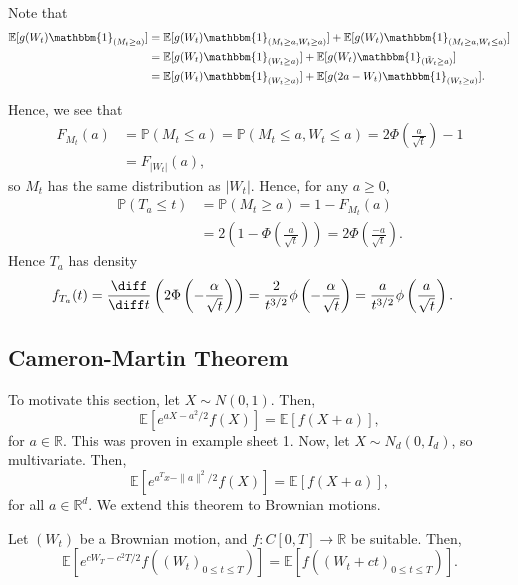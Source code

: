 \documentclass[12pt]{article}
\begin{document}
\begin{proofbox}
	Note that
	\begin{align*}
		\mathbb{E}[g(W_t)\mathbbm{1}_{(M_t \geq a)}] &= \mathbb{E}[g(W_t) \mathbbm{1}_{(M_t \geq a, W_t \geq a)}] + \mathbb{E}[g(W_t) \mathbbm{1}_{(M_t \geq a, W_t \leq a)}] \\
							     &= \mathbb{E}[g(W_t)\mathbbm{1}_{(W_t \geq a)}] + \mathbb{E}[g(W_t) \mathbbm{1}_{(\tilde W_t \geq a)}] \\
							     &= \mathbb{E}[g(W_t) \mathbbm{1}_{(W_t \geq a)}] + \mathbb{E}[g(2a - W_t) \mathbbm{1}_{(W_t \geq a)}].
	\end{align*}
\end{proofbox}

Hence, we see that
\begin{align*}
	F_{M_t}(a) &= \mathbb{P}(M_t \leq a) = \mathbb{P}(M_t \leq a, W_t \leq a) = 2 \Phi \left( \frac{a}{\sqrt t} \right) - 1 \\
		   &= F_{|W_t|}(a),
\end{align*}
so $M_t$ has the same distribution as $|W_t|$. Hence, for any $a \geq 0$,
\begin{align*}
	\mathbb{P}(T_a \leq t) &= \mathbb{P}(M_t \geq a) = 1 - F_{M_t}(a) \\
			       &= 2 \left(1 - \Phi \left( \frac{a}{\sqrt t} \right) \right) = 2 \Phi \left(\frac{-a}{\sqrt t} \right).
\end{align*}
Hence $T_a$ has density
\begin{align*}
	f_{T_a}(t) &= \frac{\diff}{\diff t} \left( 2 \Phi \left( - \frac{\alpha}{\sqrt t} \right) \right) = \frac{2}{t^{3/2}} \phi\left( - \frac{\alpha}{\sqrt t} \right) = \frac{a}{t^{3/2}} \phi \left( \frac{a}{\sqrt t} \right).
\end{align*}


\subsection{Cameron-Martin Theorem}%
\label{sub:cm_thm}

To motivate this section, let $X \sim N(0, 1)$. Then,
\[
\mathbb{E}[e^{aX - a^2/2} f(X)]=  \mathbb{E}[f(X + a)],
\]
for $a \in \mathbb{R}$. This was proven in example sheet 1. Now, let $X \sim N_d(0, I_{d})$, so multivariate. Then,
\[
\mathbb{E}[e^{a^T x - \|a\|^2/2} f(X)] = \mathbb{E}[f(X + a)],
\]
for all $a \in \mathbb{R}^d$. We extend this theorem to Brownian motions.

\begin{theorem}
	Let $(W_t)$ be a Brownian motion, and $f : C[0, T] \to \mathbb{R}$ be suitable. Then,
	\[
	\mathbb{E}[e^{c W_T - c^2T/2} f((W_t)_{0 \leq t \leq T})] = \mathbb{E}[f((W_t + ct)_{0 \leq t\leq T})].
	\]
\end{theorem}
\end{document}
